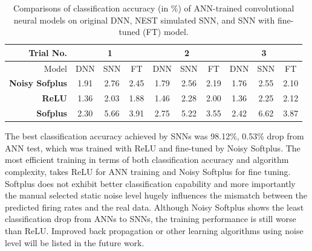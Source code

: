 	\begin{table}[tbh] 
		\caption{Comparisons of classification accuracy (in \%) of ANN-trained convolutional neural models on original DNN, NEST simulated SNN, and SNN with fine-tuned (FT) model.}
		\begin{center}
			\bgroup
			\def\arraystretch{1.5}
			\begin{tabular} {r |c  c c |c c c |c c c}
				\hline
				Trial No.
				&\multicolumn{3}{c|}{1} 
				&\multicolumn{3}{c|}{2}
				&\multicolumn{3}{c}{3}\\
				\hline
				Model
				& DNN & SNN &FT
				& DNN & SNN &FT
				& DNN & SNN &FT\\
				\hline
				\textbf{Noisy Sofplus}
				& 1.91 & 2.76 &2.45
				& 1.79 & 2.56 &2.19
				& 1.76 & 2.55 &2.10\\
				\textbf{ReLU}
				& 1.36 & 2.03 &1.88
				& 1.46 & 2.28 &2.00
				& 1.36 & 2.25 &2.12\\
				\textbf{Sofplus}
				& 2.30 & 5.66 &3.91
				& 2.75 & 5.22 &3.55
				& 2.42 & 6.62 &3.87\\
				\hline
			\end{tabular}
			\egroup
			\label{tbl:ns_result}
		\end{center}
	\end{table}
	
	
	
	
	The best classification accuracy achieved by SNNs was 98.12\%, 0.53\% drop from ANN test, which was trained with ReLU and fine-tuned by Noisy Softplus.
	The most efficient training in terms of both classification accuracy and algorithm complexity, takes ReLU for ANN training and Noisy Softplus for fine tuning.
	Softplus does not exhibit better classification capability and more importantly the manual selected static noise level hugely influences the mismatch between the predicted firing rates and the real data.
	Although Noisy Softplus shows the least classification drop from ANNs to SNNs, the training performance is still worse than ReLU.
	Improved back propagation or other learning algorithms using noise level will be listed in the future work. 
	
